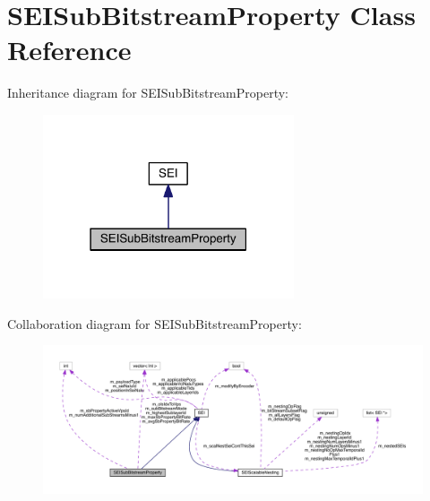 \hypertarget{class_s_e_i_sub_bitstream_property}{}\section{S\+E\+I\+Sub\+Bitstream\+Property Class Reference}
\label{class_s_e_i_sub_bitstream_property}


Inheritance diagram for S\+E\+I\+Sub\+Bitstream\+Property\+:
\nopagebreak
\begin{figure}[H]
\begin{center}
\leavevmode
\includegraphics[width=210pt]{dd/d4b/class_s_e_i_sub_bitstream_property__inherit__graph}
\end{center}
\end{figure}


Collaboration diagram for S\+E\+I\+Sub\+Bitstream\+Property\+:
\nopagebreak
\begin{figure}[H]
\begin{center}
\leavevmode
\includegraphics[width=350pt]{d8/dbb/class_s_e_i_sub_bitstream_property__coll__graph}
\end{center}
\end{figure}
